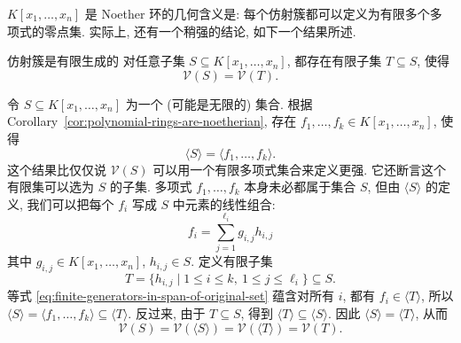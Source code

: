 $K[x_{1},\ldots,x_{n}]$ 是 Noether 环的几何含义是: 每个仿射簇都可以定义为有限多个多项式的零点集. 实际上, 还有一个稍强的结论, 如下一个结果所述.

\begin{Corollary}{仿射簇是有限生成的}\leavevmode\label{cor:affine-varieties-finitely-generated}
  对任意子集 $S\subseteq K[x_{1},\ldots,x_{n}]$, 都存在有限子集 $T\subseteq S$, 使得
  \[
    \mathcal{V}(S)=\mathcal{V}(T).
  \]
\end{Corollary}

\begin{Proof}
  \BookPairedNote
    {令 $S\subseteq K[x_{1},\ldots,x_{n}]$ 为一个 (可能是无限的) 集合. 根据 Corollary~\ref{cor:polynomial-rings-are-noetherian}, 存在 $f_{1},\ldots,f_{k}\in K[x_{1},\ldots,x_{n}]$, 使得
    \[
      \langle S\rangle=\langle f_{1},\ldots,f_{k}\rangle.
    \]}
    {这个结果比仅仅说 $\mathcal{V}(S)$ 可以用一个有限多项式集合来定义更强. 它还断言这个有限集可以选为 $S$ 的子集.}
  \noindent 多项式 $f_{1},\ldots,f_{k}$ 本身未必都属于集合 $S$, 但由 $\langle S\rangle$ 的定义, 我们可以把每个 $f_{i}$ 写成 $S$ 中元素的线性组合:
  \begin{equation}\label{eq:finite-generators-in-span-of-original-set}
    f_{i}=\sum_{j=1}^{\ell_{i}}g_{i,j}h_{i,j}
  \end{equation}
  其中 $g_{i,j}\in K[x_{1},\ldots,x_{n}]$, $h_{i,j}\in S$. 定义有限子集
  \[
    T=\{h_{i,j}\mid1\leq i\leq k,\ 1\leq j\leq\ell_{i}\}\subseteq S.
  \]
  等式 \eqref{eq:finite-generators-in-span-of-original-set} 蕴含对所有 $i$, 都有 $f_{i}\in\langle T\rangle$, 所以 $\langle S\rangle=\langle f_{1},\ldots,f_{k}\rangle\subseteq\langle T\rangle$. 反过来, 由于 $T\subseteq S$, 得到 $\langle T\rangle\subseteq\langle S\rangle$. 因此 $\langle S\rangle=\langle T\rangle$, 从而
  \[
    \mathcal{V}(S)=\mathcal{V}(\langle S\rangle)=\mathcal{V}(\langle T\rangle)=\mathcal{V}(T).
  \]
\end{Proof}

